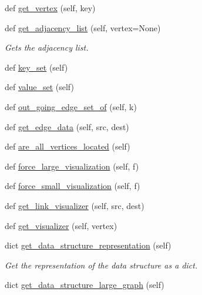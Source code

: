 \begin{DoxyCompactItemize}
def \mbox{\hyperlink{classbridges_1_1graph__adj__list_1_1_graph_adj_list_af484d881d91177e723faf8b8a5c427e2}{get\+\_\+vertex}} (self, key)
\item 
def \mbox{\hyperlink{classbridges_1_1graph__adj__list_1_1_graph_adj_list_a523adce952c66505abc5ad14a83ae4c4}{get\+\_\+adjacency\+\_\+list}} (self, vertex=None)
\begin{DoxyCompactList}\small\item\em Gets the adjacency list. \end{DoxyCompactList}\item 
def \mbox{\hyperlink{classbridges_1_1graph__adj__list_1_1_graph_adj_list_a96e264e71acad7474e233a1ec1d1035a}{key\+\_\+set}} (self)
\item 
def \mbox{\hyperlink{classbridges_1_1graph__adj__list_1_1_graph_adj_list_ae12db7b48cf37ba8d2852fa05ebaa2c0}{value\+\_\+set}} (self)
\item 
def \mbox{\hyperlink{classbridges_1_1graph__adj__list_1_1_graph_adj_list_a4ae90f3f2db5f44219fe2a6f9035c9d6}{out\+\_\+going\+\_\+edge\+\_\+set\+\_\+of}} (self, k)
\item 
def \mbox{\hyperlink{classbridges_1_1graph__adj__list_1_1_graph_adj_list_abf7a65867ab342ef0eda4a34b3fe011e}{get\+\_\+edge\+\_\+data}} (self, src, dest)
\item 
def \mbox{\hyperlink{classbridges_1_1graph__adj__list_1_1_graph_adj_list_a9041f2a5c754141afbc41f02c6a2771c}{are\+\_\+all\+\_\+vertices\+\_\+located}} (self)
\item 
def \mbox{\hyperlink{classbridges_1_1graph__adj__list_1_1_graph_adj_list_aa0eaa5a21f8d8905d02454a83151c20e}{force\+\_\+large\+\_\+visualization}} (self, f)
\item 
def \mbox{\hyperlink{classbridges_1_1graph__adj__list_1_1_graph_adj_list_a036b6368bf916474da748e96dd93ec5a}{force\+\_\+small\+\_\+visualization}} (self, f)
\item 
def \mbox{\hyperlink{classbridges_1_1graph__adj__list_1_1_graph_adj_list_abaa3015ae78e0f5ebc6fd2d2d2772927}{get\+\_\+link\+\_\+visualizer}} (self, src, dest)
\item 
def \mbox{\hyperlink{classbridges_1_1graph__adj__list_1_1_graph_adj_list_ad63fce416ec0fdfd99d05e6236807fd8}{get\+\_\+visualizer}} (self, vertex)
\item 
dict \mbox{\hyperlink{classbridges_1_1graph__adj__list_1_1_graph_adj_list_a6861666885cc98206667114193dbc776}{get\+\_\+data\+\_\+structure\+\_\+representation}} (self)
\begin{DoxyCompactList}\small\item\em Get the representation of the data structure as a dict. \end{DoxyCompactList}\item 
dict \mbox{\hyperlink{classbridges_1_1graph__adj__list_1_1_graph_adj_list_aa3f4846ffb28436cb54be40b0c4a0126}{get\+\_\+data\+\_\+structure\+\_\+large\+\_\+graph}} (self)
\end{DoxyCompactItemize}
